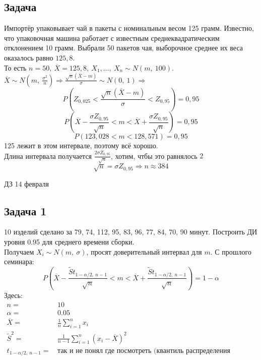 \documentclass[12pt, a4paper]{article}
\begin{document}
\subsection*{Задача}
Импортёр упаковывает чай в пакеты с номинальным весом 125 грамм. Известно, что упаковочная машина работает с известным среднеквадратическим отклонением 10 грамм. Выбрали 50 пакетов чая, выборочное среднее их веса оказалось равно $125,8$.\\
То есть $n = 50,\ \overline{X} = 125,8,\ X_1,\dots,\ X_n \sim N(m,\ 100)$.\\
$\overline{X} \sim N\left(m,\ \frac{\sigma^2}{n}\right)\Rightarrow \frac{\sqrt{n} (\overline{X} - m)}{\sigma} \sim N(0,\ 1)\Rightarrow$
\[P\left( Z_{0,025} < \frac{\sqrt{n}(\overline{X} - m)}{\sigma} < Z_{0,95} \right) = 0,95\]
\[P\left( \overline{X} - \frac{\sigma Z_{0,95}}{\sqrt{n}} < m < \overline{X} + \frac{\sigma Z_{0,95}}{\sqrt{n}} \right) = 0,95\]
\[P(123,028 < m < 128,571) = 0,95\]
125 лежит в этом интервале, поэтому всё хорошо.\\
Длина интервала получается $\frac{2\sigma Z_{0,95}}{\sqrt{n}}$, хотим, чтбы это равнялось $2$
\[\sqrt{n} = \sigma Z_{0,95} \Rightarrow n \approx 384\]

\begin{center}
    ДЗ 14 февраля
\end{center}
\subsection*{Задача 1}
10 изделий сделано за 79, 74, 112, 95, 83, 96, 77, 84, 70, 90 минут. Построить ДИ уровня 0.95 для среднего времени сборки.\\
Получаем $X_i \sim N(m,\ \sigma)$, просят доверительный интервал для $m$. С прошлого семинара:
\[P\left( \overline{X} - \frac{\tilde S t_{1 - \alpha/2,\ n - 1}}{\sqrt{n}} < m < \overline{X} + \frac{\tilde S t_{1 - \alpha/2,\ n - 1}}{\sqrt{n}} \right) = 1 - \alpha\]
Здесь:
\begin{equation*}
    \begin{aligned}
        n =                        & \, 10                                                                      \\
        \alpha =                   & \, 0.05                                                                    \\
        \overline{X} =             & \, \frac{1}{n} \sum_{i = 1}^{n} x_i                                        \\
        \tilde S^2 =               & \, \frac{1}{n - 1}\sum_{i = 1}^{n} (x_i - \overline{X})^2                  \\
        t_{1 - \alpha/2,\ n - 1} = & \, \text{так и не понял где посмотреть (квантиль распределения Стьюдента)} \\
    \end{aligned}
\end{equation*}
\end{document}
